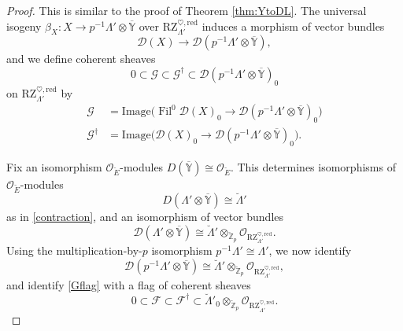 \documentclass[11pt]{alggeom}
\newcommand{\iso}{\cong}
\newcommand{\red}{\mathrm{red}}
\newcommand{\Z}{\mathbb Z}
\newcommand{\co}{\mathcal O}
\DeclareMathOperator{\Fil}{Fil}
\begin{document}
\begin{proof}
This is similar to the proof of Theorem \ref{thm:YtoDL}.  
The universal isogeny $\beta_X:X  \to   p^{-1} \Lambda' \otimes \overline{\mathbb{Y}} $
over $\mathrm{RZ}_{\Lambda'}^{\heartsuit,\red}$ induces a 
 morphism of vector bundles
\[
  \mathscr{D}(X)  \to \mathscr{D}( p^{-1} \Lambda' \otimes \overline{\mathbb{Y}} ) ,
\]
and we define coherent sheaves 
\begin{equation}\label{Gflag}
0 \subset \mathscr{G} \subset \mathscr{G}^\dagger \subset \mathscr{D}( p^{-1} \Lambda' \otimes \overline{\mathbb{Y}} )_0 
\end{equation}
on $\mathrm{RZ}_{\Lambda'}^{\heartsuit,\red}$ by
\begin{align*}
\mathscr{G} 
&  = \mathrm{Image} \big(  \Fil^0 \mathscr{D}(X)_0  \to 
 \mathscr{D}( p^{-1} \Lambda' \otimes \overline{\mathbb{Y}} )_0  \big) \\
 \mathscr{G}^\dagger
&  = \mathrm{Image} \big(  \mathscr{D}(X)_0  \to 
 \mathscr{D}( p^{-1} \Lambda' \otimes \overline{\mathbb{Y}} )_0  
 \big).
\end{align*}




Fix an isomorphism $\co_{\breve{E}}$-modules $D(\overline{\mathbb{Y}}) \iso \co_{\breve{E}}$.
This determines isomorphisms of $\co_{\breve{E}}$-modules
\[
D( \Lambda'\otimes \overline{\mathbb{Y}}) \iso  \breve{\Lambda}' 
\]
 as in \eqref{contraction}, and an isomorphism of vector bundles
\[
\mathscr{D}( \Lambda'\otimes \overline{\mathbb{Y}}) \iso 
 \breve{\Lambda}'  \otimes_{ \breve{\Z}_p} \co_{\mathrm{RZ}_{\Lambda'}^{\heartsuit,\red} }.
\]
Using the multiplication-by-$p$ isomorphism $p^{-1}\Lambda' \iso \Lambda'$, we now identify
\[
\mathscr{D}( p^{-1} \Lambda' \otimes \overline{\mathbb{Y}} ) 
\iso  \breve{\Lambda}'  \otimes_{\breve{\Z}_p} \co_{\mathrm{RZ}_{\Lambda'}^{\heartsuit,\red} },
\]
and identify \eqref{Gflag} with a flag of coherent sheaves
\begin{equation}\label{aux flag}
0 \subset \mathscr{F} \subset \mathscr{F}^\dagger \subset  \breve{\Lambda}' _0
 \otimes_{ \breve{\Z}_p} \co_{\mathrm{RZ}_{\Lambda'}^{\heartsuit,\red} }.
\end{equation}



\end{proof}
\end{document}
